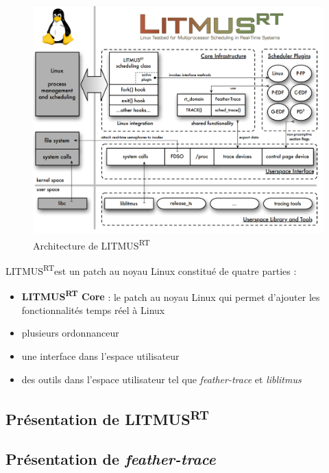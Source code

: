 \documentclass{article}
\newcommand{\litmus}{LITMUS\textsuperscript{RT}}
\begin{document}
\begin{figure}[H]
    \centering
    \includegraphics[width=0.5\paperwidth]{Images/litmusrtarchitecture.png}
    \caption{Architecture de \litmus}
    \label{fig:litmusrtarchitecture}
\end{figure}

    \litmus est un patch au noyau Linux constitué de quatre parties : 
    \begin{itemize}
        \item \textbf{LITMUS\textsuperscript{RT} Core} : le patch au noyau Linux qui permet d'ajouter les fonctionnalités temps réel à Linux
        \item plusieurs \gls{ordonnanceur}
        \item une interface dans l'espace utilisateur
        \item des outils dans l'espace utilisateur tel que \textit{feather-trace} et \textit{liblitmus}
    \end{itemize}


    \subsection{Présentation de \litmus}
    
    
    
    \subsection{Présentation de \textit{feather-trace}}
    
\end{document}
